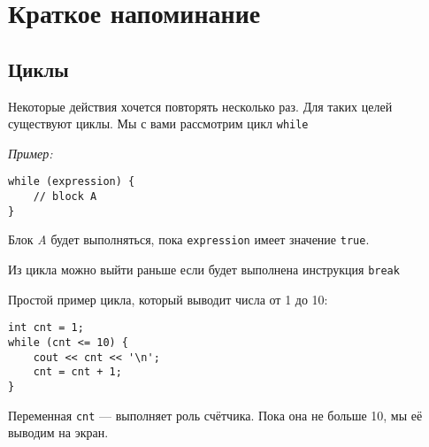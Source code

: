 \documentclass[10pt,a4paper]{article}
\begin{document}
\parindent=0cm

\section*{Краткое напоминание}


\subsection*{Циклы}

Некоторые действия хочется повторять несколько раз. Для таких
целей существуют циклы. Мы с вами рассмотрим цикл \lstinline|while|

\textit{Пример:}
\begin{lstlisting}
while (expression) {
    // block A
}
\end{lstlisting}

Блок \textit{A} будет выполняться, пока \lstinline|expression|
имеет значение \lstinline|true|.

Из цикла можно выйти раньше если будет выполнена инструкция \lstinline|break|


Простой пример цикла, который выводит числа от 1 до 10:

\begin{lstlisting}
int cnt = 1;
while (cnt <= 10) {
    cout << cnt << '\n';
    cnt = cnt + 1;
}
\end{lstlisting}

Переменная \lstinline|cnt| --- выполняет роль счётчика. Пока она не больше 10, мы её выводим на экран.
\end{document}
